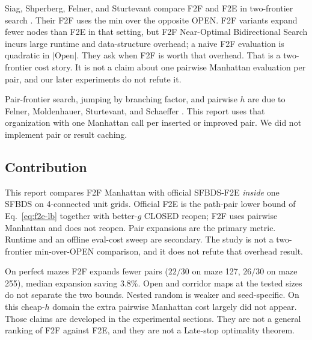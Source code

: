Siag, Shperberg, Felner, and Sturtevant compare F2F and F2E in two-frontier search \cite{siag2023socs}. Their F2F uses the min over the opposite OPEN. F2F variants expand fewer nodes than F2E in that setting, but F2F Near-Optimal Bidirectional Search incurs large runtime and data-structure overhead; a naive F2F evaluation is quadratic in \(|\mathrm{Open}|\). They ask when F2F is worth that overhead. That is a two-frontier cost story. It is not a claim about one pairwise Manhattan evaluation per pair, and our later experiments do not refute it.

Pair-frontier search, jumping by branching factor, and pairwise \(h\) are due to Felner, Moldenhauer, Sturtevant, and Schaeffer \cite{felner2010sfbds}. This report uses that organization with one Manhattan call per inserted or improved pair. We did not implement pair or result caching.

\subsection{Contribution}

This report compares F2F Manhattan with official SFBDS-F2E \emph{inside} one SFBDS on 4-connected unit grids. Official F2E is the path-pair lower bound of Eq.~\eqref{eq:f2e-lb} together with better-\(g\) CLOSED reopen; F2F uses pairwise Manhattan and does not reopen. Pair expansions are the primary metric. Runtime and an offline eval-cost sweep are secondary. The study is not a two-frontier min-over-OPEN comparison, and it does not refute that overhead result.

On perfect mazes F2F expands fewer pairs (\(22/30\) on maze 127, \(26/30\) on maze 255), median expansion saving \(3.8\%\). Open and corridor maps at the tested sizes do not separate the two bounds. Nested random is weaker and seed-specific. On this cheap-\(h\) domain the extra pairwise Manhattan cost largely did not appear. Those claims are developed in the experimental sections. They are not a general ranking of F2F against F2E, and they are not a Late-stop optimality theorem.
